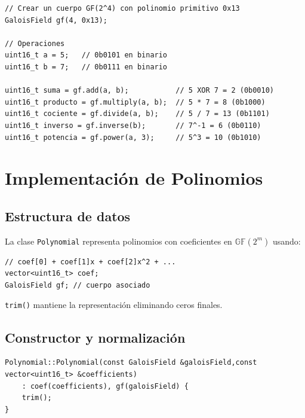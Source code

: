 \begin{lstlisting}[style=CodigoCPP, caption={Ejemplo de inicialización y ejecución de operaciones aritméticas en el cuerpo de Galois $\text{GF}(2^4)$.}, label={lst:gf_ejemplo_uso}]
// Crear un cuerpo GF(2^4) con polinomio primitivo 0x13
GaloisField gf(4, 0x13);

// Operaciones
uint16_t a = 5;   // 0b0101 en binario
uint16_t b = 7;   // 0b0111 en binario

uint16_t suma = gf.add(a, b);           // 5 XOR 7 = 2 (0b0010)
uint16_t producto = gf.multiply(a, b);  // 5 * 7 = 8 (0b1000)
uint16_t cociente = gf.divide(a, b);    // 5 / 7 = 13 (0b1101)
uint16_t inverso = gf.inverse(b);       // 7^-1 = 6 (0b0110)
uint16_t potencia = gf.power(a, 3);     // 5^3 = 10 (0b1010)
\end{lstlisting}

\section{Implementación de Polinomios}
\label{sec:polynomial}

\subsection{Estructura de datos}

La clase \texttt{Polynomial} representa polinomios con coeficientes en $\mathbb{GF}(2^m)$ usando:

\begin{lstlisting}[style=CodigoCPP, caption={Atributos principales de la clase \texttt{Polynomial}: vector de coeficientes y referencia al cuerpo finito subyacente.}, label={lst:poly_atributos}]
// coef[0] + coef[1]x + coef[2]x^2 + ...
vector<uint16_t> coef;
GaloisField gf; // cuerpo asociado
\end{lstlisting}

\texttt{trim()} mantiene la representación eliminando ceros finales.

\subsection{Constructor y normalización}

\begin{lstlisting}[style=CodigoCPP, caption={Constructor de la clase \texttt{Polynomial} que inicializa los coeficientes y limpia términos nulos superiores.}, label={lst:poly_constructor}]
Polynomial::Polynomial(const GaloisField &galoisField,const vector<uint16_t> &coefficients)
    : coef(coefficients), gf(galoisField) {
    trim();
}
\end{lstlisting}

